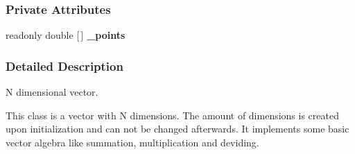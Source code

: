\subsubsection*{Private Attributes}
\begin{DoxyCompactItemize}
\item 
\mbox{\label{classDataTools_1_1GenericVector_ac05213eecd8c2fa58764505999b2fe36}} 
readonly double \mbox{[}$\,$\mbox{]} {\bfseries \+\_\+points}
\end{DoxyCompactItemize}


\subsubsection{Detailed Description}
N dimensional vector. 

This class is a vector with N dimensions. The amount of dimensions is created upon initialization and can not be changed afterwards. It implements some basic vector algebra like summation, multiplication and deviding. 